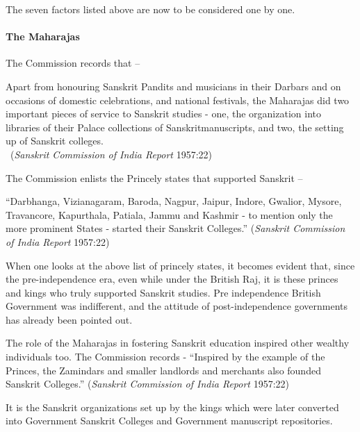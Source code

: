 The seven factors listed above are now to be considered one by one.

\paragraph{The Maharajas}

The Commission records that –
\begin{myquote}
\eleven
Apart from honouring Sanskrit Pandits and musicians in their Darbars and on occasions of domestic celebrations, and national festivals, the Maharajas did two important pieces of service to Sanskrit studies - one, the organization into libraries of their Palace collections of Sanskrit\break manuscripts, and two, the setting up of Sanskrit colleges.\\[-15pt]

~\hfill({\sl Sanskrit Commission of India Report} 1957:22)
\end{myquote}

The Commission enlists the Princely states that supported Sanskrit –
\begin{myquote}
\eleven
“Darbhanga, Vizianagaram, Baroda, Nagpur, Jaipur, Indore, Gwalior, Mysore, Travancore, Kapurthala, Patiala, Jammu and Kashmir - to mention only the more prominent States - started their Sanskrit Colleges.” \hfill({\sl Sanskrit Commission of India Report} 1957:22)
\end{myquote}

When one looks at the above list of princely states, it becomes evident that, since the pre-independence era, even while under the British Raj, it is these princes and kings who truly supported Sanskrit studies. Pre independence British Government was indifferent, and the attitude of post-independence governments has already been pointed out. 

The role of the Maharajas in fostering Sanskrit education inspired other wealthy individuals too. The Commission records - “Inspired by the example of the Princes, the Zamindars and smaller landlords and merchants also founded Sanskrit Colleges.” ({\sl Sanskrit Commission of India Report} 1957:22)

It is the Sanskrit organizations set up by the kings which were later converted into Government Sanskrit Colleges and Government manuscript repositories.    

